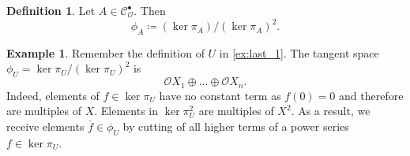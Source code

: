 \documentclass{article}
\theoremstyle{plain}%
\theoremstyle{definition}
\newtheorem{definition}[theorem]{Definition}
\newtheorem{example}[theorem]{Example}
\theoremstyle{remark}
\newcommand{\cob}{\mathcal{C}_\mathcal{O}^\bullet}
\begin{document}
\begin{definition}
    Let \(A \in \cob\). Then
    \[\phi_A \coloneqq (\ker \pi_A)/(\ker \pi_A)^2.\]
\end{definition}

\begin{example}\label{ex:last_phi}
    Remember the definition of \(U\) in \cref{ex:last_1}.
    The tangent space \(\phi_U = \ker \pi_U/(\ker \pi_U)^2\) is
    \[
        \mathcal{O}X_1 \oplus \dots \oplus \mathcal{O}X_n.
    \]
    Indeed, elements of \(f \in \ker \pi_U\) have no constant term as \(f(0) = 0\) and therefore are multiples of \(X\).
    Elements in \(\ker \pi_U^2\) are multiples of \(X^2\). As a result, we receive elements \(\overline{f} \in \phi_U\) by
    cutting of all higher terms of a power series \(f \in \ker \pi_U\).
\end{example}
\end{document}
